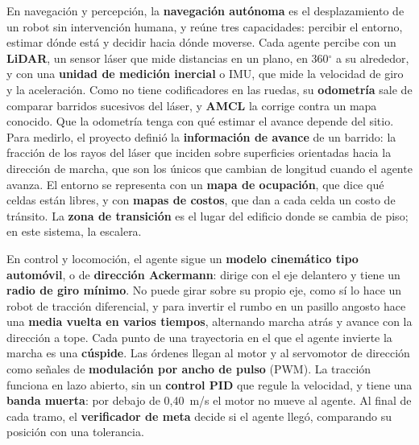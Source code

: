 En navegación y percepción, la \textbf{navegación autónoma} es el desplazamiento
de un robot sin intervención humana, y reúne tres capacidades: percibir el
entorno, estimar dónde está y decidir hacia dónde moverse. Cada agente percibe
con un \textbf{LiDAR}, un sensor láser que mide distancias en un plano, en
360$^\circ$ a su alrededor, y con una \textbf{unidad de medición inercial} o
IMU, que mide la velocidad de giro y la aceleración. Como no tiene codificadores
en las ruedas, su \textbf{odometría} sale de comparar barridos sucesivos del
láser, y \textbf{AMCL} la corrige contra un mapa conocido. Que la odometría
tenga con qué estimar el avance depende del sitio. Para medirlo, el proyecto definió la \textbf{información de avance} de un
barrido: la fracción de los rayos del láser que inciden sobre superficies
orientadas hacia la dirección de marcha, que son los únicos que cambian de longitud
cuando el agente avanza. El entorno
se representa con un \textbf{mapa de ocupación}, que dice qué celdas están libres,
y con \textbf{mapas de costos}, que dan a cada celda un costo de tránsito. La
\textbf{zona de transición} es el lugar del edificio donde se cambia de piso; en
este sistema, la escalera.

En control y locomoción, el agente sigue un \textbf{modelo cinemático tipo
automóvil}, o de \textbf{dirección Ackermann}: dirige con el eje delantero y
tiene un \textbf{radio de giro mínimo}. No puede girar sobre su propio eje, como sí lo
hace un robot de tracción diferencial, y para invertir el rumbo en un
pasillo angosto hace una \textbf{media vuelta en varios tiempos}, alternando
marcha atrás y avance con la dirección a tope. Cada punto de una trayectoria en
el que el agente invierte la marcha es una \textbf{cúspide}. Las órdenes llegan
al motor y al servomotor de dirección como señales de \textbf{modulación por
ancho de pulso} (PWM). La tracción funciona en lazo abierto, sin un
\textbf{control PID} que regule la velocidad, y tiene una \textbf{banda muerta}:
por debajo de 0,40~m/s el motor no mueve al agente. Al final de cada tramo, el
\textbf{verificador de meta} decide si el agente llegó, comparando su posición
con una tolerancia.

